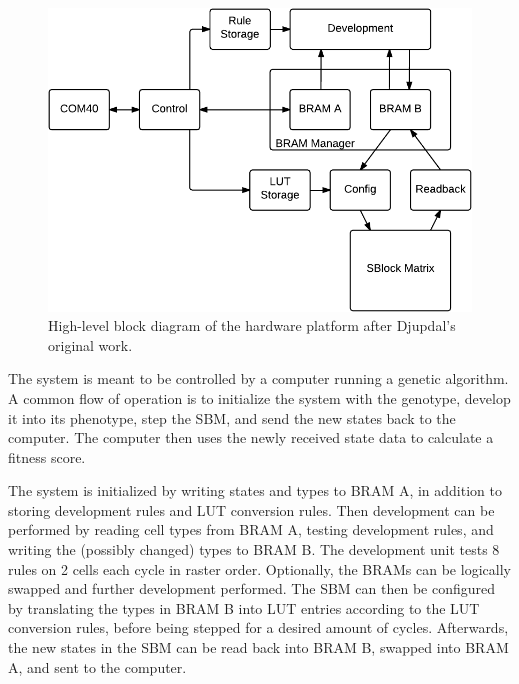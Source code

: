 \begin{figure}[!ht]
    \centering
    \includegraphics[width=42\block]{figures/overview-djupdal}
    \caption[Djupdal's hardware design]{
        High-level block diagram of the hardware platform after Djupdal's original work.
    }
    \label{fig:overview-djupdal}
\end{figure}

The system is meant to be controlled by a computer running a genetic algorithm.
A common flow of operation is to initialize the system with the genotype, develop it into its phenotype, step the SBM, and send the new states back to the computer.
The computer then uses the newly received state data to calculate a fitness score.

The system is initialized by writing states and types to BRAM A, in addition to storing development rules and LUT conversion rules.
Then development can be performed by reading cell types from BRAM A\footnotemark, testing development rules, and writing the (possibly changed) types to BRAM B.
The development unit tests 8 rules on 2 cells each cycle in raster order.
Optionally, the BRAMs can be logically swapped and further development performed.
The SBM can then be configured by translating the types in BRAM B into LUT entries according to the LUT conversion rules, before being stepped for a desired amount of cycles.
Afterwards, the new states in the SBM can be read back into BRAM B, swapped into BRAM A, and sent to the computer.

